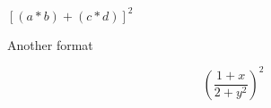 \documentclass{sample}
\begin{document}
\begin{center}
$[(a*b)+(c*d)]^{2}$
\end{center}

Another format

\[
    \left( \frac{1+x}{2+y^{2}} \right)^{2}
\]
\end{document}
